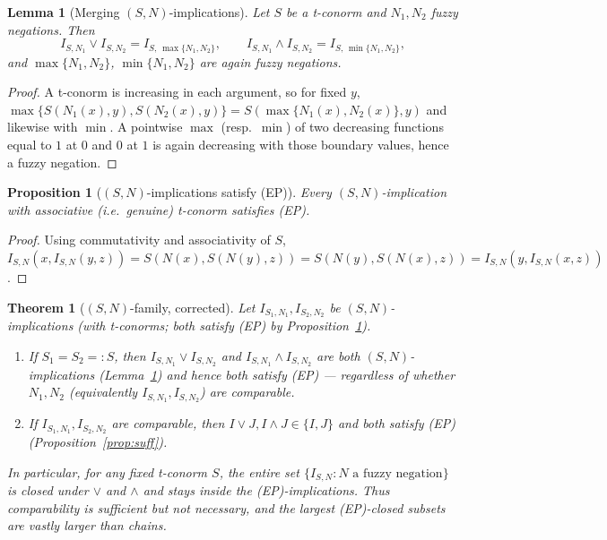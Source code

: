 \documentclass{amsart}
\theoremstyle{plain}
\newtheorem{theorem}{Theorem}
\newtheorem{lemma}{Lemma}
\newtheorem{proposition}{Proposition}
\theoremstyle{definition}
\begin{document}
\begin{lemma}[Merging $(S,N)$-implications]\label{lem:SNmerge}
Let $S$ be a t-conorm and $N_1,N_2$ fuzzy negations.  Then
\[
I_{S,N_1}\vee I_{S,N_2}=I_{S,\,\max\{N_1,N_2\}},\qquad
I_{S,N_1}\wedge I_{S,N_2}=I_{S,\,\min\{N_1,N_2\}},
\]
and $\max\{N_1,N_2\}$, $\min\{N_1,N_2\}$ are again fuzzy negations.
\end{lemma}

\begin{proof}
A t-conorm is increasing in each argument, so for fixed $y$,
$\max\{S(N_1(x),y),S(N_2(x),y)\}=S(\max\{N_1(x),N_2(x)\},y)$ and likewise with $\min$.
A pointwise $\max$ (resp.\ $\min$) of two decreasing functions equal to $1$ at $0$ and $0$
at $1$ is again decreasing with those boundary values, hence a fuzzy negation.
\end{proof}

\begin{proposition}[$(S,N)$-implications satisfy (EP)]\label{prop:SNEP}
Every $(S,N)$-implication with associative (i.e.\ genuine) t-conorm satisfies
\textup{(EP)}.
\end{proposition}

\begin{proof}
Using commutativity and associativity of $S$,
$I_{S,N}(x,I_{S,N}(y,z))=S(N(x),S(N(y),z))=S(N(y),S(N(x),z))=I_{S,N}(y,I_{S,N}(x,z))$.
\end{proof}

\begin{theorem}[$(S,N)$-family, corrected]\label{thm:SN}
Let $I_{S_1,N_1},I_{S_2,N_2}$ be $(S,N)$-implications (with t-conorms; both satisfy
\textup{(EP)} by Proposition~\ref{prop:SNEP}).
\begin{enumerate}
\item If $S_1=S_2=:S$, then $I_{S,N_1}\vee I_{S,N_2}$ and $I_{S,N_1}\wedge I_{S,N_2}$ are
\emph{both} $(S,N)$-implications (Lemma~\ref{lem:SNmerge}) and hence \emph{both} satisfy
\textup{(EP)} --- regardless of whether $N_1,N_2$ (equivalently $I_{S,N_1},I_{S,N_2}$) are
comparable.
\item If $I_{S_1,N_1},I_{S_2,N_2}$ are comparable, then $I\vee J,I\wedge J\in\{I,J\}$ and
both satisfy \textup{(EP)} (Proposition~\ref{prop:suff}).
\end{enumerate}
In particular, for any fixed t-conorm $S$, the entire set
$\{I_{S,N}:N\text{ a fuzzy negation}\}$ is closed under $\vee$ and $\wedge$ and stays
inside the \textup{(EP)}-implications.  Thus comparability is \emph{sufficient but not
necessary}, and the largest \textup{(EP)}-closed subsets are vastly larger than chains.
\end{theorem}
\end{document}
